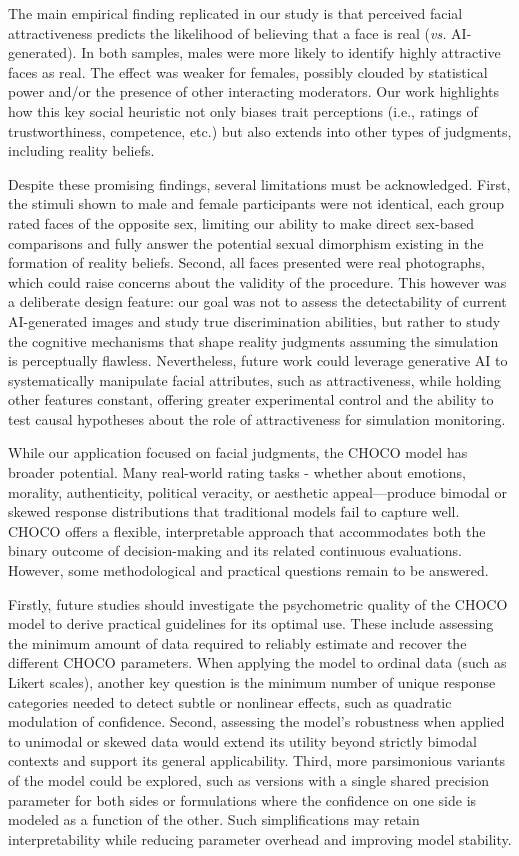 \documentclass[
  jou,
  floatsintext,
  longtable,
  nolmodern,
  notxfonts,
  notimes,
  colorlinks=true,linkcolor=blue,citecolor=blue,urlcolor=blue]{apa7}
\begin{document}
The main empirical finding replicated in our study is that perceived
facial attractiveness predicts the likelihood of believing that a face
is real (\emph{vs.} AI-generated). In both samples, males were more
likely to identify highly attractive faces as real. The effect was
weaker for females, possibly clouded by statistical power and/or the
presence of other interacting moderators. Our work highlights how this
key social heuristic not only biases trait perceptions (i.e., ratings of
trustworthiness, competence, etc.) but also extends into other types of
judgments, including reality beliefs.

Despite these promising findings, several limitations must be
acknowledged. First, the stimuli shown to male and female participants
were not identical, each group rated faces of the opposite sex, limiting
our ability to make direct sex-based comparisons and fully answer the
potential sexual dimorphism existing in the formation of reality
beliefs. Second, all faces presented were real photographs, which could
raise concerns about the validity of the procedure. This however was a
deliberate design feature: our goal was not to assess the detectability
of current AI-generated images and study true discrimination abilities,
but rather to study the cognitive mechanisms that shape reality
judgments assuming the simulation is perceptually flawless.
Nevertheless, future work could leverage generative AI to systematically
manipulate facial attributes, such as attractiveness, while holding
other features constant, offering greater experimental control and the
ability to test causal hypotheses about the role of attractiveness for
simulation monitoring.

While our application focused on facial judgments, the CHOCO model has
broader potential. Many real-world rating tasks - whether about
emotions, morality, authenticity, political veracity, or aesthetic
appeal---produce bimodal or skewed response distributions that
traditional models fail to capture well. CHOCO offers a flexible,
interpretable approach that accommodates both the binary outcome of
decision-making and its related continuous evaluations. However, some
methodological and practical questions remain to be answered.

Firstly, future studies should investigate the psychometric quality of
the CHOCO model to derive practical guidelines for its optimal use.
These include assessing the minimum amount of data required to reliably
estimate and recover the different CHOCO parameters. When applying the
model to ordinal data (such as Likert scales), another key question is
the minimum number of unique response categories needed to detect subtle
or nonlinear effects, such as quadratic modulation of confidence.
Second, assessing the model's robustness when applied to unimodal or
skewed data would extend its utility beyond strictly bimodal contexts
and support its general applicability. Third, more parsimonious variants
of the model could be explored, such as versions with a single shared
precision parameter for both sides or formulations where the confidence
on one side is modeled as a function of the other. Such simplifications
may retain interpretability while reducing parameter overhead and
improving model stability.
\end{document}
